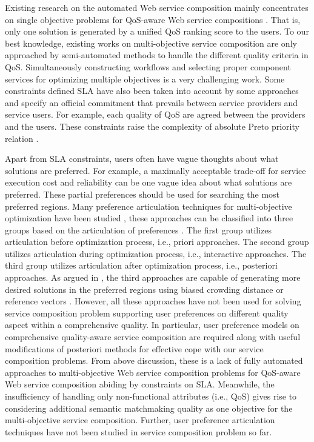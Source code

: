Existing research on the automated Web service composition mainly concentrates on single objective problems for QoS-aware Web service compositions \cite{canfora2005approach,da2015graphevol,da2015gp,lecue2009optimizing,liu2007hybrid,long2009environment,ma2015hybrid,pop2009immune,rodriguez2010composition,tang2010hybrid,yu2013adaptive}. That is, only one solution is generated by a unified QoS ranking score to the users. To our best knowledge, existing works on multi-objective service composition \cite{liu2005dynamic,wada2012e3,yao2009qos,yin2014hybrid} are only approached by semi-automated methods to handle the different quality criteria in QoS. Simultaneously constructing workflows and selecting proper component services for optimizing multiple objectives is a very challenging work. Some constraints defined SLA have also been taken into account by some approaches \cite{wada2012e3,yin2014hybrid} and specify an official commitment that prevails between service providers and service users. For example, each quality of QoS are agreed between the providers and the users. These constraints raise the complexity of absolute Preto priority relation \cite{garey1979guide}. 

Apart from SLA constraints, users often have vague thoughts about what solutions are preferred. For example, a maximally acceptable trade-off for service execution cost and reliability can be one vague idea about what solutions are preferred. These partial preferences should be used for searching the most preferred regions. Many preference articulation techniques for multi-objective optimization have been studied \cite{branke2016using,branke2005integrating,branke2001guidance,cheng2015reference,giagkiozis2014pareto}, these approaches can be classified into three groups based on the articulation of preferences \cite{van2000multiobjective}. The first group utilizes articulation before optimization process, i.e., priori approaches. The second group utilizes articulation during optimization process, i.e., interactive approaches. The third group utilizes articulation after optimization process, i.e., posteriori approaches. As argued in \cite{giagkiozis2014pareto}, the third approaches are capable of generating more desired solutions in the preferred regions using biased crowding distance \cite{branke2005integrating} or reference vectors \cite{cheng2015reference}. However, all these approaches have not been used for solving service composition problem supporting user preferences on different quality aspect within a comprehensive quality. In particular, user preference models on comprehensive quality-aware service composition are required along with useful modifications of posteriori methods for effective cope with our service composition problems. From above discussion, these is a lack of fully automated approaches to multi-objective Web service composition problems for QoS-aware Web service composition abiding by constraints on SLA. Meanwhile, the insufficiency of handling only non-functional attributes (i.e., QoS) gives rise to considering additional semantic matchmaking quality as one objective for the multi-objective service composition. Further, user preference articulation techniques have not been studied in service composition problem so far.

